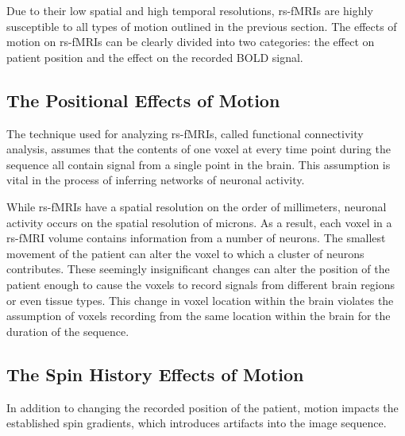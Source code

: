 Due to their low spatial and high temporal resolutions, rs-fMRIs are highly susceptible to all types of motion outlined in the previous section. The effects of motion on rs-fMRIs can be clearly divided into two categories: the effect on patient position and the effect on the recorded BOLD signal.

\subsection{The Positional Effects of Motion}

The technique used for analyzing rs-fMRIs, called functional connectivity analysis, assumes that the contents of one voxel at every time point during the sequence all contain signal from a single point in the brain. This assumption is vital in the process of inferring networks of neuronal activity. 

While rs-fMRIs have a spatial resolution on the order of millimeters, neuronal activity occurs on the spatial resolution of microns. As a result, each voxel in a rs-fMRI volume contains information from a number of neurons. The smallest movement of the patient can alter the voxel to which a cluster of neurons contributes. These seemingly insignificant changes can alter the position of the patient enough to cause the voxels to record signals from different brain regions or even tissue types. This change in voxel location within the brain violates the assumption of voxels recording from the same location within the brain for the duration of the sequence.


\subsection{The Spin History Effects of Motion}

In addition to changing the recorded position of the patient, motion impacts the established spin gradients, which introduces artifacts into the image sequence.


